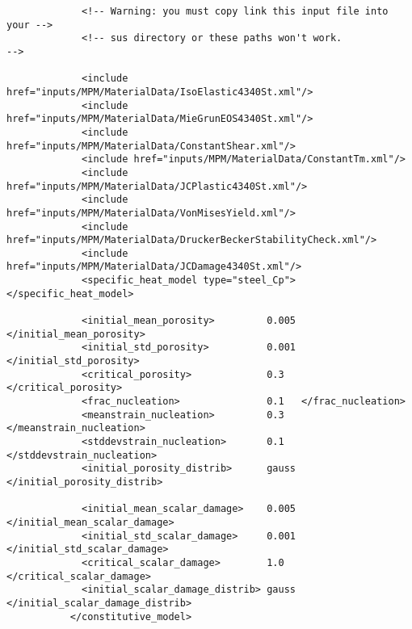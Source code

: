\begin{verbatim}
             <!-- Warning: you must copy link this input file into your -->
             <!-- sus directory or these paths won't work.              -->

             <include href="inputs/MPM/MaterialData/IsoElastic4340St.xml"/>
             <include href="inputs/MPM/MaterialData/MieGrunEOS4340St.xml"/>
             <include href="inputs/MPM/MaterialData/ConstantShear.xml"/>
             <include href="inputs/MPM/MaterialData/ConstantTm.xml"/>
             <include href="inputs/MPM/MaterialData/JCPlastic4340St.xml"/>
             <include href="inputs/MPM/MaterialData/VonMisesYield.xml"/>
             <include href="inputs/MPM/MaterialData/DruckerBeckerStabilityCheck.xml"/>
             <include href="inputs/MPM/MaterialData/JCDamage4340St.xml"/>
             <specific_heat_model type="steel_Cp"> </specific_heat_model>

             <initial_mean_porosity>         0.005 </initial_mean_porosity>
             <initial_std_porosity>          0.001 </initial_std_porosity>
             <critical_porosity>             0.3   </critical_porosity>
             <frac_nucleation>               0.1   </frac_nucleation>
             <meanstrain_nucleation>         0.3   </meanstrain_nucleation>
             <stddevstrain_nucleation>       0.1   </stddevstrain_nucleation>
             <initial_porosity_distrib>      gauss </initial_porosity_distrib>

             <initial_mean_scalar_damage>    0.005  </initial_mean_scalar_damage>
             <initial_std_scalar_damage>     0.001 </initial_std_scalar_damage>
             <critical_scalar_damage>        1.0   </critical_scalar_damage>
             <initial_scalar_damage_distrib> gauss </initial_scalar_damage_distrib>
           </constitutive_model>                                      
       

\end{verbatim}
